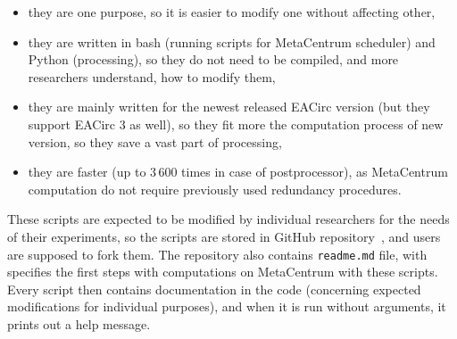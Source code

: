 \documentclass[
  print, %
  Table,   %
  nolof,     %
  nolot,     %
  11pt, %
  oneside  %
]{fithesis3}
\begin{document}
\begin{itemize}
    \item they are one purpose, so it is easier to modify one without affecting other,
    \item they are written in bash (running scripts for MetaCentrum scheduler) and Python (processing), so they do not need to be compiled, and more researchers understand, how to modify them,
    \item they are mainly written for the newest released EACirc version (but they support EACirc 3 as well), so they fit more the computation process of new version, so they save a vast part of processing,
    \item they are faster (up to 3\,600 times in case of postprocessor), as MetaCentrum computation do not require previously used redundancy procedures.
\end{itemize}

These scripts are expected to be modified by individual researchers for the needs of their experiments, so the scripts are stored in GitHub repository~\cite{eaUtils}, and users are supposed to fork them. The repository also contains \texttt{readme.md} file, with specifies the first steps with computations on MetaCentrum with these scripts. Every script then contains documentation in the code (concerning expected modifications for individual purposes), and when it is run without arguments, it prints out a help message.
\end{document}
